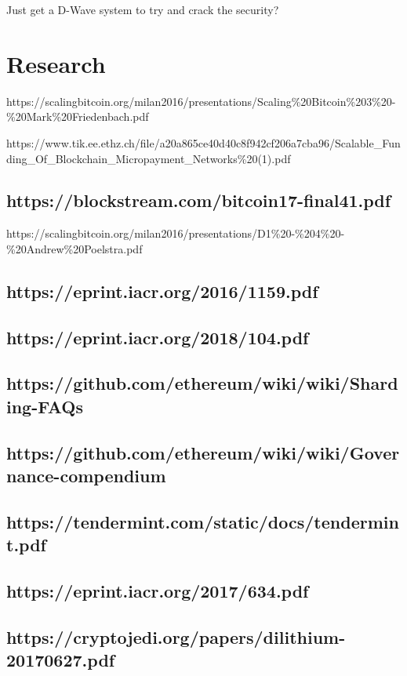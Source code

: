 \documentclass[11pt]{article}
\begin{document}
Just get a D-Wave system to try and crack the security?


\section{Research}

https://scalingbitcoin.org/milan2016/presentations/Scaling\%20Bitcoin\%203\%20-\%20Mark\%20Friedenbach.pdf


https://www.tik.ee.ethz.ch/file/a20a865ce40d40c8f942cf206a7cba96/Scalable\_Funding\_Of\_Blockchain\_Micropayment\_Networks\%20(1).pdf


\subsection{https://blockstream.com/bitcoin17-final41.pdf}

https://scalingbitcoin.org/milan2016/presentations/D1\%20-\%204\%20-\%20Andrew\%20Poelstra.pdf


\subsection{https://eprint.iacr.org/2016/1159.pdf}

\subsection{https://eprint.iacr.org/2018/104.pdf}

\subsection{https://github.com/ethereum/wiki/wiki/Sharding-FAQs}

\subsection{https://github.com/ethereum/wiki/wiki/Governance-compendium}

\subsection{https://tendermint.com/static/docs/tendermint.pdf}

\subsection{https://eprint.iacr.org/2017/634.pdf}

\subsection{https://cryptojedi.org/papers/dilithium-20170627.pdf}
\end{document}
